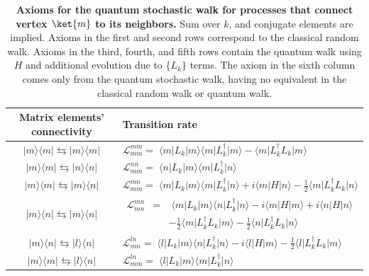 \documentclass[11pt,oneside,final]{huthesis}%
\begin{document}
\begin{table}
\begin{tabular}{c l} %
\hline\hline                        %
Matrix elements' connectivity &  \qquad Transition rate \\ [0.5ex]
\hline \hline                    %
  $\vert m \rangle \langle m \vert \leftrightarrows \vert m \rangle \langle m \vert$  &  $\mathcal{L}^{mm}_{mm}=\;\langle m \vert L_k\vert m \rangle \langle m \vert L_k^\dagger \vert m \rangle -\langle m \vert L_k^\dagger L_k\vert m \rangle$ \\ %
  $\vert m \rangle \langle m \vert \leftrightarrows \vert n \rangle \langle n \vert$ & $\mathcal{L}_{mm}^{nn}=\; \langle n \vert L_k\vert m \rangle \langle m \vert L_k^\dagger \vert n \rangle $ \\ [1ex] 
\hline 
 $\vert m \rangle \langle m \vert \leftrightarrows \vert m \rangle \langle n \vert$ & $\mathcal{L}^{mn}_{mm}=\; \langle m \vert L_k\vert m \rangle  \langle m \vert L_k^\dagger \vert n \rangle + i\langle m \vert H\vert n \rangle-\frac{1}{2}\langle m \vert L_k^\dagger L_k\vert n \rangle$ \\ 
 $\vert m \rangle \langle n \vert \leftrightarrows \vert m \rangle \langle n \vert $ &$\begin{array}{lll} \mathcal{L}^{mn}_{mn}&=&\;\langle m \vert L_k\vert m \rangle \langle n \vert L_k^\dagger \vert n \rangle-i\langle m \vert H\vert m \rangle+i\langle n \vert H\vert n \rangle\\
														 &&-\frac{1}{2}\langle m \vert L_k^\dagger L_k\vert m \rangle -\frac{1}{2}\langle n \vert L_k^\dagger L_k\vert n \rangle\end{array}$\\ 
 $\vert m \rangle \langle n \vert \leftrightarrows \vert l \rangle \langle n \vert $& $\mathcal{L}^{ln}_{mn}=\; \langle l \vert L_k\vert m \rangle \langle n\vert L_k^\dagger \vert n \rangle-i\langle l \vert H\vert m \rangle-\frac{1}{2}\langle l \vert L_k^\dagger L_k\vert m \rangle$\\ [1ex]
\hline 
 $\vert m \rangle \langle m \vert \leftrightarrows \vert l \rangle \langle n \vert$ & $\mathcal{L}^{ln}_{mm}=\; \langle l \vert L_k\vert m \rangle  \langle m \vert L_k^\dagger \vert n \rangle$ \\ 
[1ex]       %
\hline \hline     %
\end{tabular}  %
\caption{\textbf{Axioms for the quantum stochastic walk for processes that connect vertex $\ket{m}$ to its neighbors.} Sum over $k$, and conjugate elements are implied. Axioms in the first and second rows correspond to the classical random walk. Axioms in the third, fourth, and fifth rows contain the quantum walk using $H$ and additional evolution due to $\{L_k\}$ terms. The axiom in the sixth column comes only from the quantum stochastic walk, having no equivalent in the classical random walk or quantum walk.} 
\label{connectivity}   
\end{table}
\end{document}
